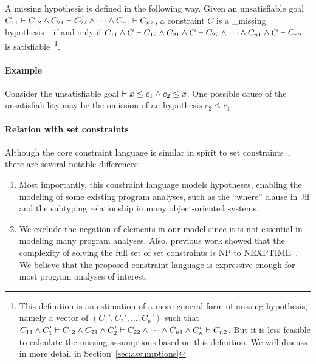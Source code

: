 A missing hypothesis is defined in the following way.
Given an unsatisfiable goal $C_{11} \vdash C_{12} \land C_{21} \vdash C_{22}
\land \dots \land C_{n1} \vdash C_{n2}$, a constraint $C$ is a _missing
hypothesis_ if and only if $C_{11} \land C \vdash C_{12} \land C_{21} \land C
\vdash C_{22} \land \dots \land C_{n1} \land C \vdash C_{n2}$ is
satisfiable~\footnote{This definition is an estimation of a more general form
of missing hypothesis, namely a vector of $(C_1', C_2', \dots, C_n')$ such that
$C_{11} \land C_1' \vdash C_{12} \land C_{21} \land C_2' \vdash C_{22} \land
\dots \land C_{n1} \land C_n' \vdash C_{n2}$. But it is less feasible to
calculate the missing assumptions based on this definition. We will discuss in
more detail in Section~\ref{sec:assumptions}}.

\paragraph{Example}
Consider the unsatisfiable goal $\vdash x \leq c_1 \land c_2 \leq x$.
One possible cause of the unsatisfiability may be the omission of an
hypothesis $c_2\leq c_1$.

\paragraph{Relation with set constraints}

Although the core constraint language is similar in spirit to set
constraints~\cite{aiken-setconstraint}, there are several notable
differences:

\begin{enumerate}

\item Most importantly, this constraint language models hypotheses,
enabling the modeling of some existing program analyses, such as the
``where'' clause in Jif and the subtyping relationship in many
object-oriented systems. 

\item We exclude the negation of elements in our model since it is not
essential in modeling many program analyses. Also, previous work
showed that the complexity of solving the full set of set constraints
is NP to NEXPTIME~\cite{aiken-complexity}. We believe that the
proposed constraint language is expressive enough for most program
analyses of interest.

\end{enumerate}


